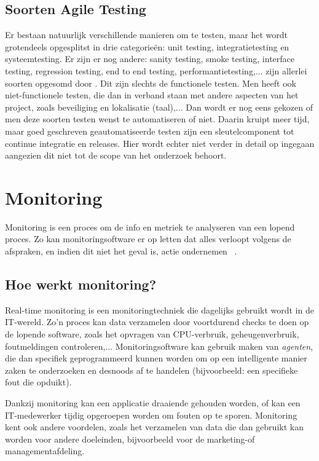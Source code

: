 \subsection{Soorten Agile Testing}
\label{sec:kindsOfTesting}

Er bestaan natuurlijk verschillende manieren om te testen, maar het wordt grotendeels opgesplitst in drie categorieën: unit testing, integratietesting en systeemtesting. Er zijn er nog andere: sanity testing, smoke testing, interface testing, regression testing, end to end testing, performantietesting,... zijn allerlei soorten opgesomd door \textcite{Pittet}. Dit zijn slechts de functionele testen. Men heeft ook niet-functionele testen, die dan in verband staan met andere aspecten van het project, zoals beveiliging en lokalisatie (taal),... Dan wordt er nog eens gekozen of men deze soorten testen wenst te automatiseren of niet. Daarin kruipt meer tijd, maar goed geschreven geautomatiseerde testen zijn een sleutelcomponent tot continue integratie en releases. Hier wordt echter niet verder in detail op ingegaan aangezien dit niet tot de scope van het onderzoek behoort.

\section{Monitoring}
\label{sec:monitoring}

Monitoring is een proces om de info en metriek te analyseren van een lopend proces. Zo kan monitoringsoftware er op letten dat alles verloopt volgens de afspraken, en indien dit niet het geval is, actie ondernemen ~\autocite{Rouse2018}. 

\subsection{Hoe werkt monitoring?}
\label{sec:howMonitoringWorks}

Real-time monitoring is een monitoringtechniek die dagelijks gebruikt wordt in de IT-wereld. Zo'n proces kan data verzamelen door voortdurend checks te doen op de lopende software, zoals het opvragen van CPU-verbruik, geheugenverbruik, foutmeldingen controleren,... Monitoringsoftware kan gebruik maken van \textit{agenten}, die dan specifiek geprogrammeerd kunnen worden om op een intelligente manier zaken te onderzoeken en desnoods af te handelen (bijvoorbeeld: een specifieke fout die opduikt).

Dankzij monitoring kan een applicatie draaiende gehouden worden, of kan een IT-medewerker tijdig opgeroepen worden om fouten op te sporen. Monitoring kent ook andere voordelen, zoals het verzamelen van data die dan gebruikt kan worden voor andere doeleinden, bijvoorbeeld voor de marketing-of managementafdeling. 

